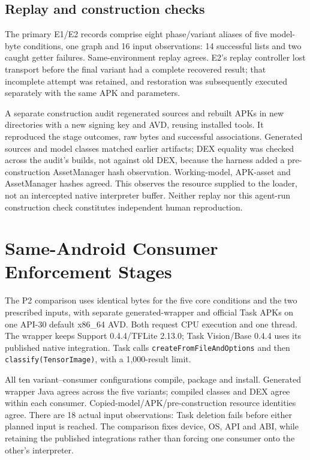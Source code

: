 \documentclass[10pt,twocolumn,letterpaper]{article}
\newcommand{\code}[1]{\texttt{#1}}
\begin{document}
\subsection{Replay and construction checks}
The primary E1/E2 records comprise eight phase/variant aliases of five model-byte conditions, one graph and 16 input observations: 14 successful lists and two caught getter failures. Same-environment replay agrees. E2's replay controller lost transport before the final variant had a complete recovered result; that incomplete attempt was retained, and restoration was subsequently executed separately with the same APK and parameters.

A separate construction audit regenerated sources and rebuilt APKs in new directories with a new signing key and AVD, reusing installed tools. It reproduced the stage outcomes, raw bytes and successful associations. Generated sources and model classes matched earlier artifacts; DEX equality was checked across the audit's builds, not against old DEX, because the harness added a pre-construction AssetManager hash observation. Working-model, APK-asset and AssetManager hashes agreed. This observes the resource supplied to the loader, not an intercepted native interpreter buffer. Neither replay nor this agent-run construction check constitutes independent human reproduction.

\section{Same-Android Consumer Enforcement Stages}
\label{sec:consumers}
The P2 comparison uses identical bytes for the five core conditions and the two prescribed inputs, with separate generated-wrapper and official Task APKs on one API-30 default x86\_64 AVD. Both request CPU execution and one thread. The wrapper keeps Support 0.4.4/TFLite 2.13.0; Task Vision/Base 0.4.4 uses its published native integration. Task calls \code{createFromFileAndOptions} and then \code{classify(TensorImage)}, with a 1,000-result limit.

All ten variant--consumer configurations compile, package and install. Generated wrapper Java agrees across the five variants; compiled classes and DEX agree within each consumer. Copied-model/APK/pre-construction resource identities agree. There are 18 actual input observations: Task deletion fails before either planned input is reached. The comparison fixes device, OS, API and ABI, while retaining the published integrations rather than forcing one consumer onto the other's interpreter.
\end{document}
